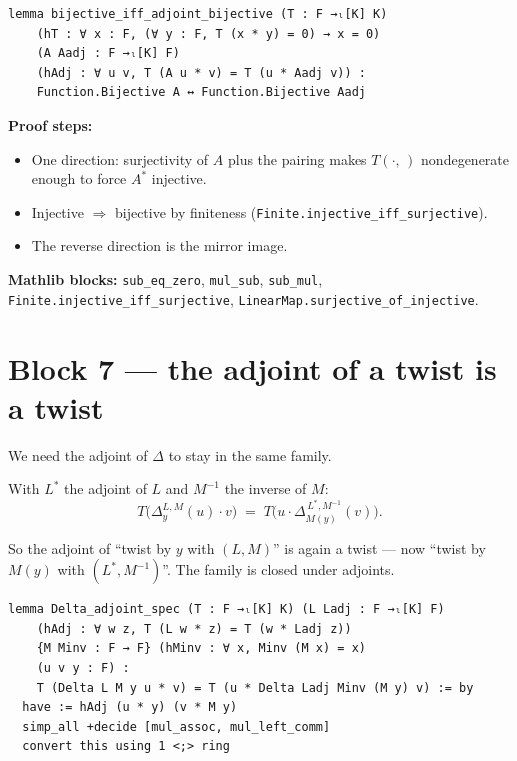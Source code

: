 \documentclass[11pt]{article}
\begin{document}
\begin{lstlisting}
lemma bijective_iff_adjoint_bijective (T : F →ₗ[K] K)
    (hT : ∀ x : F, (∀ y : F, T (x * y) = 0) → x = 0)
    (A Aadj : F →ₗ[K] F)
    (hAdj : ∀ u v, T (A u * v) = T (u * Aadj v)) :
    Function.Bijective A ↔ Function.Bijective Aadj
\end{lstlisting}

\textbf{Proof steps:}
\begin{itemize}
  \item One direction: surjectivity of $A$ plus the pairing makes $T(\cdot,\,)$
        nondegenerate enough to force $A^{*}$ injective.
  \item Injective $\Rightarrow$ bijective by finiteness
        (\texttt{Finite.injective\_iff\_surjective}).
  \item The reverse direction is the mirror image.
\end{itemize}

\textbf{Mathlib blocks:}
\texttt{sub\_eq\_zero}, \texttt{mul\_sub}, \texttt{sub\_mul},
\texttt{Finite.injective\_iff\_surjective},
\texttt{LinearMap.surjective\_of\_injective}.

\section{Block 7 --- the adjoint of a twist is a twist}

We need the adjoint of $\Delta$ to stay in the same family.

With $L^{*}$ the adjoint of $L$ and $M^{-1}$ the inverse of $M$:
\[
  T\bigl(\Delta_y^{L,M}(u)\cdot v\bigr)
  \;=\;
  T\bigl(u\cdot \Delta_{M(y)}^{\,L^{*},M^{-1}}(v)\bigr).
\]

So the adjoint of ``twist by $y$ with $(L,M)$'' is again a twist ---
now ``twist by $M(y)$ with $(L^{*},M^{-1})$''.
The family is closed under adjoints.

\begin{center}
\end{center}

\begin{lstlisting}
lemma Delta_adjoint_spec (T : F →ₗ[K] K) (L Ladj : F →ₗ[K] F)
    (hAdj : ∀ w z, T (L w * z) = T (w * Ladj z))
    {M Minv : F → F} (hMinv : ∀ x, Minv (M x) = x)
    (u v y : F) :
    T (Delta L M y u * v) = T (u * Delta Ladj Minv (M y) v) := by
  have := hAdj (u * y) (v * M y)
  simp_all +decide [mul_assoc, mul_left_comm]
  convert this using 1 <;> ring
\end{lstlisting}
\end{document}
